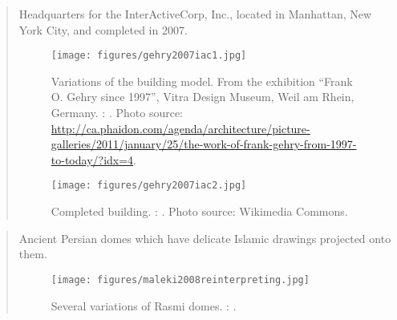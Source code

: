 		
\clearpage
{}
		\begin{quote}
		\small
		Headquarters for the InterActiveCorp, Inc., located in Manhattan, New York City, and completed in 2007.
		
		\begin{figure}[htb]
		\begin{center}
		\texttt{[image: figures/gehry2007iac1.jpg]}
		\caption{
		Variations of the building model.
		From the exhibition ``Frank O. Gehry since 1997'', Vitra Design Museum, Weil am Rhein, Germany. 
		\citeauthor{gehry2007iac}: 
		\cite{gehry2007iac}.
		Photo source: \url{http://ca.phaidon.com/agenda/architecture/picture-galleries/2011/january/25/the-work-of-frank-gehry-from-1997-to-today/?idx=4}.		
		}		
		\label{fig:gehry2007iac}
		\end{center}
		\end{figure}		
		
		\begin{figure}[htb]
		\begin{center}
		\texttt{[image: figures/gehry2007iac2.jpg]}
		\caption{
		Completed building.
		\citeauthor{gehry2007iac}: 
		\cite{gehry2007iac}.
		Photo source: Wikimedia Commons.
		}		
		\label{fig:gehry2007iac2}
		\end{center}
		\end{figure}		
		
		\end{quote}

\clearpage
{}
		\begin{quote}
		\small
		Ancient Persian domes which have delicate Islamic drawings projected onto them. 
		\begin{figure}[htb]
		\begin{center}
		\texttt{[image: figures/maleki2008reinterpreting.jpg]}
		\caption{
		Several variations of Rasmi domes.
		\citeauthor{maleki2008reinterpreting}: 
		\cite{maleki2008reinterpreting}.}		
		\label{fig:maleki2008reinterpreting}
		\end{center}
		\end{figure}		
		\end{quote}
					
